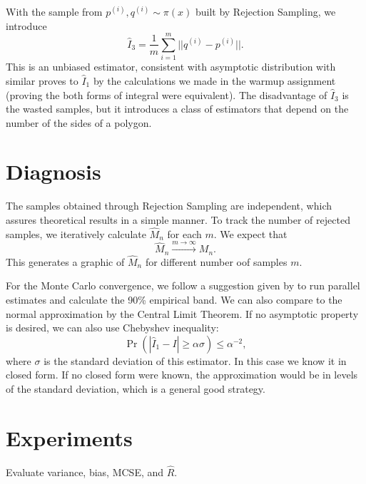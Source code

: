 \documentclass[a4paper,10pt, notitlepage]{report}
\begin{document}
With the sample from $p^{(i)}, q^{(i)} \sim \pi(x)$ built by Rejection Sampling, we
introduce 
$$
\hat{I}_3 = \frac{1}{m} \sum_{i=1}^m ||q^{(i)} - p^{(i)}||. 
$$
This is an unbiased estimator, consistent with asymptotic distribution 
with similar proves to $\hat{I}_1$ by the calculations we made in the warmup
assignment (proving the both forms of integral were equivalent). The disadvantage of $\hat{I}_3$ is the wasted samples,
but it introduces a class of estimators that depend on the number of the sides
of a polygon. 

\section*{Diagnosis}

The samples obtained through Rejection Sampling are independent, which assures
theoretical results in a simple manner. 
To track the number of rejected samples, we iteratively
calculate $\widehat{M}_n$ for each $m$. We expect that 
$$\widehat{M}_n \overset{m \to \infty}{\to} M_n.$$
This generates a graphic of $\widehat{M}_n$ for different number oof samples
$m$.

For the Monte Carlo convergence, we follow a suggestion given by \cite[p.
124]{robert2004monte} to run parallel estimates and calculate the 90\% empirical
band. We can also compare to the normal approximation  by the Central Limit
Theorem. If no asymptotic property is desired, we can also use Chebyshev
inequality:
$$
\Pr(|\hat{I}_1 - I| \ge \alpha \sigma) \le \alpha^{-2},  
$$
where $\sigma$ is the standard deviation of this estimator. In this case we 
know it in closed form. If no closed form were known, the approximation would
be in levels of the standard deviation, which is a general good strategy.

\section*{Experiments}

Evaluate variance, bias, MCSE, and $\hat{R}$. 



\end{document}
